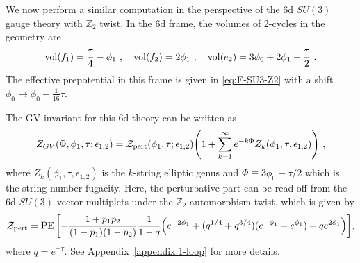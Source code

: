 We now perform a similar computation in the perspective of the 6d $SU(3)$ gauge theory with $\mathbb{Z}_2$ twist. In the 6d frame, the volumes of 2-cycles in the geometry are 
\begin{equation}
	{\rm vol}(f_1) = \frac{\tau}{4} - \phi_1 \ , \quad {\rm vol}(f_2) = 2\phi_1 \ , \quad {\rm vol}(e_2) = 3\phi_0+2\phi_1-\frac{\tau}{2}\ .
\end{equation}
The effective prepotential in this frame is given in \eqref{eq:E-SU3-Z2} with a shift $\phi_0 \rightarrow \phi_0-\frac{1}{16}\tau$. 

The GV-invariant for this 6d theory can be written as
\begin{align}
Z_{GV}(\Phi, \phi_1, \tau; \epsilon_{1,2})
= \mathcal{Z}_{\mathrm{pert}}(\phi_1, \tau; \epsilon_{1,2})  \qty(1 + \sum_{k=1}^{\infty} e^{-k \Phi} Z_k(\phi_1, \tau, \epsilon_{1,2}))\ ,
\end{align}
where $ Z_k(\phi_1, \tau, \epsilon_{1,2}) $ is the $ k $-string elliptic genus and $\Phi\equiv 3\phi_0-\tau/2$ which is the string number fugacity. Here, the perturbative part can be read off from the 6d $SU(3)$ vector multiplets under the $\mathbb{Z}_2$ automorphism twist, which is given by
\begin{align}
\mathcal{Z}_{\mathrm{pert}}
= \operatorname{PE} \qty[ -\frac{1+p_1 p_2}{(1-p_1)(1-p_2)} \frac{1}{1-q} \qty(e^{-2\phi_1} + (q^{1/4}+q^{3/4})(e^{-\phi_1}+e^{\phi_1}) + q e^{2\phi_1}) ] , 
\end{align}
where $ q = e^{-\tau} $. See Appendix~\ref{appendix:1-loop} for more details.

